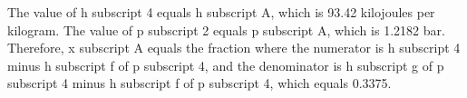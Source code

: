 The value of h subscript 4 equals h subscript A, which is 93.42 kilojoules per kilogram. The value of p subscript 2 equals p subscript A, which is 1.2182 bar. Therefore, x subscript A equals the fraction where the numerator is h subscript 4 minus h subscript f of p subscript 4, and the denominator is h subscript g of p subscript 4 minus h subscript f of p subscript 4, which equals 0.3375.